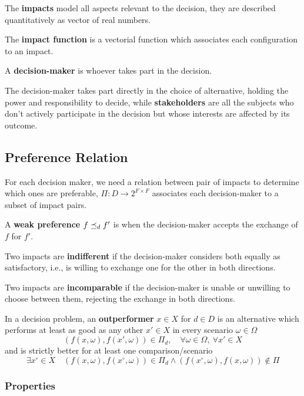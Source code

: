 The \textbf{impacts} model all aspects relevant to the decision, they are described quantitatively as vector of real numbers.

The \textbf{impact function} is a vectorial function which associates each configuration to an impact.

A \textbf{decision-maker} is whoever takes part in the decision. 

The decision-maker takes part directly in the choice of alternative, holding the power and responsibility to decide, while \textbf{stakeholders} are all the subjects who don't actively participate in the decision but whose interests are affected by its outcome.

\subsection{Preference Relation}

For each decision maker, we need a relation between pair of impacts to determine which ones are preferable, $\Pi: D \rightarrow 2^{F \times F}$ associates each decision-maker to a subset of impact pairs.

A \textbf{weak preference} $f \preceq_{d} f'$ is when the decision-maker accepts the exchange of $f$ for $f'$.

Two impacts are \textbf{indifferent} if the decision-maker considers both equally as satisfactory, i.e., is willing to exchange one for the other in both directions.

Two impacts are \textbf{incomparable} if the decision-maker is unable or unwilling to choose between them, rejecting the exchange in both directions.

In a decision problem, an \textbf{outperformer} $x \in X$ for $d \in D$ is an alternative which performs at least as good as any other $x' \in X$ in every scenario $\omega \in \Omega$
$$ (f(x, \omega), f(x', \omega)) \in \Pi_d, \quad \forall \omega \in \Omega, \ \forall x' \in X $$
and is strictly better for at least one comparison/scenario
$$ \exists x^\circ \in X \quad \left(f(x, \omega), f(x^\circ, \omega)\right) \in \Pi_d \wedge \left(f(x^\circ, \omega), f(x, \omega)\right) \notin \Pi$$

\subsubsection{Properties}

